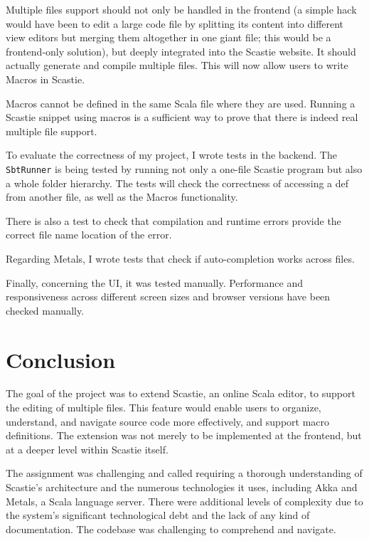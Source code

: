 \documentclass[a4paper,11pt,oneside]{report}
\begin{document}
Multiple files support should not only be handled in the frontend (a simple hack would have been to edit a large code file by splitting its content into different view editors but merging them altogether in one giant file; this would be a frontend-only solution), but deeply integrated into the Scastie website. It should actually generate and compile multiple files. This will now allow users to write Macros in Scastie.

Macros cannot be defined in the same Scala file where they are used. Running a Scastie snippet using macros is a sufficient way to prove that there is indeed real multiple file support.

To evaluate the correctness of my project, I wrote tests in the backend. The \lstinline{SbtRunner} is being tested by running not only a one-file Scastie program but also a whole folder hierarchy. The tests will check the correctness of accessing a def from another file, as well as the Macros functionality.

There is also a test to check that compilation and runtime errors provide the correct file name location of the error.

Regarding Metals, I wrote tests that check if auto-completion works across files.

Finally, concerning the UI, it was tested manually. Performance and responsiveness across different screen sizes and browser versions have been checked manually.

\chapter{Conclusion}

The goal of the project was to extend Scastie, an online Scala editor, to support the editing of multiple files. This feature would enable users to organize, understand, and navigate source code more effectively, and support macro definitions. The extension was not merely to be implemented at the frontend, but at a deeper level within Scastie itself.

The assignment was challenging and called requiring a thorough understanding of Scastie's architecture and the numerous technologies it uses, including Akka and Metals, a Scala language server. 
There were additional levels of complexity due to the system's significant technological debt and the lack of any kind of documentation. The codebase was challenging to comprehend and navigate.
\end{document}
